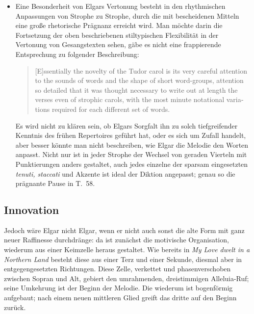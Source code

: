 \documentclass[a4paper,11pt,open=any]{scrbook}
\newcommand{\engquote}[1]{\foreignblockquote{english}{#1}}
\begin{document}
\begin{itemize}
 \item Eine Besonderheit von Elgars Vertonung besteht in den rhythmischen
 Anpassungen von Strophe zu Strophe, durch die mit bescheidenen Mitteln
 eine große rhetorische Prägnanz erreicht wird.  Man möchte darin die
 Fortsetzung der oben beschriebenen stiltypischen Flexibilität in der
 Vertonung von Gesangstexten sehen, gäbe es nicht eine frappierende
 Entsprechung zu folgender Beschreibung: \engquote{[E]ssentially the
 novelty of the Tudor carol is its very careful attention to the sounds
 of words and the shape of short word-groups, attention so detailed that
 it was thought necessary to write out at length the verses even of
 strophic carols, with the most minute notational variations required
 for each different set of words.\cite[S.~170]{carol}}  Es wird nicht
 zu klären sein, ob Elgars Sorgfalt ihn zu solch tiefgreifender Kenntnis
 des frühen Repertoires geführt hat, oder es sich um Zufall handelt, aber
 besser könnte man nicht beschreiben, wie Elgar die Melodie den Worten
 anpasst.  Nicht nur ist in jeder Strophe der Wechsel von geraden Vierteln
 mit Punktierungen anders gestaltet, auch jedes einzelne der sparsam
 eingesetzten \textit{tenuti, staccati} und Akzente ist ideal der Diktion
 angepasst; genau so die prägnante Pause in T.~58.
\end{itemize}

\subsection*{Innovation}
Jedoch wäre Elgar nicht Elgar, wenn er nicht auch sonst die alte Form
mit ganz neuer Raffinesse durchdränge: da ist zunächst die motivische
Organisation, wiederum aus einer Keimzelle heraus gestaltet.  Wie bereits
in \textit{My Love dwelt in a Northern Land} besteht diese aus einer Terz
und einer Sekunde, diesmal aber in entgegengesetzten Richtungen.  Diese
Zelle, verkettet und phasenverschoben zwischen Sopran und Alt, gebiert
den umrahmenden, dreistimmigen Alleluia-Ruf; seine Umkehrung ist der
Beginn der Melodie.  Die wiederum ist bogenförmig aufgebaut; nach einem
neuen mittleren Glied greift das dritte auf den Beginn zurück.
\end{document}
